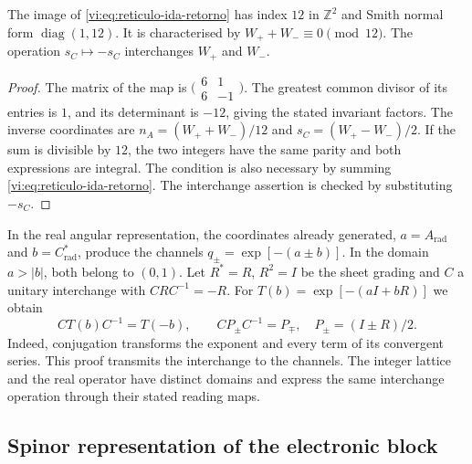 \begin{proposition}
\label{vi:prop:indice-bidireccional}
The image of \eqref{vi:eq:reticulo-ida-retorno} has index $12$
in $\mathbb Z^2$ and Smith normal form $\operatorname{diag}(1,12)$.
It is characterised by $W_++W_-\equiv0\pmod{12}$. The operation
$s_C\mapsto-s_C$ interchanges $W_+$ and $W_-$.
\end{proposition}
\begin{proof}
The matrix of the map is
$\bigl(\begin{smallmatrix}6&1\\6&-1\end{smallmatrix}\bigr)$.
The greatest common divisor of its entries is $1$, and its determinant
is $-12$, giving the stated invariant factors. The inverse
coordinates are
$n_A=(W_++W_-)/12$ and $s_C=(W_+-W_-)/2$.
If the sum is divisible by $12$, the two integers have the same
parity and both expressions are integral. The condition is also
necessary by summing \eqref{vi:eq:reticulo-ida-retorno}.
The interchange assertion is checked by substituting $-s_C$.
\end{proof}

In the real angular representation, the coordinates already generated,
$a=A_{\mathrm{rad}}$ and $b=C^*_{\mathrm{rad}}$, produce the
channels $q_\pm=\exp[-(a\pm b)]$. In the domain $a>|b|$, both
belong to $(0,1)$. Let $R^*=R$, $R^2=I$ be the sheet
grading and $C$ a unitary interchange with $CRC^{-1}=-R$.
For $T(b)=\exp[-(aI+bR)]$ we obtain
\begin{equation}
 CT(b)C^{-1}=T(-b),\qquad
 CP_\pm C^{-1}=P_\mp,\quad P_\pm=(I\pm R)/2.
 \label{vi:eq:conjugacion-canales}
\end{equation}
Indeed, conjugation transforms the exponent and every term
of its convergent series. This proof transmits the interchange to
the channels. The integer lattice and the real operator have distinct
domains and express the same interchange operation through
their stated reading maps.

\subsection{Spinor representation of the electronic block}
\label{vi:subsec:spin-electron}

